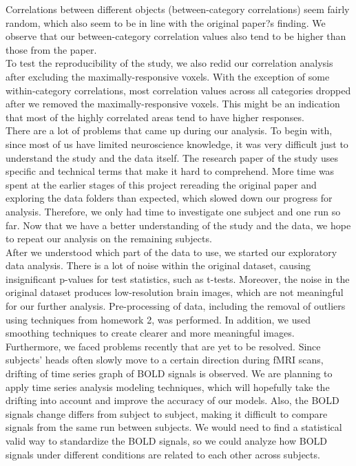 \documentclass[11pt,twocolumn]{article}
\begin{document}
Correlations between different objects (between-category correlations) seem 
fairly random, which also seem to be in line with the original paper?s finding. 
We observe that our between-category correlation values also tend to be higher 
than those from the paper. \\

To test the reproducibility of the study, we also redid our correlation analysis 
after excluding the maximally-responsive voxels. With the exception of some 
within-category correlations, most correlation values across all categories dropped 
after we removed the maximally-responsive voxels. This might be an indication 
that most of the highly correlated areas tend to have higher responses. \\

There are a lot of problems that came up during our analysis. To begin with, 
since most of us have limited neuroscience knowledge, it was very difficult 
just to understand the study and the data itself. The research paper of the 
study uses specific and technical terms that make it hard to comprehend. 
More time was spent at the earlier stages of this project rereading the 
original paper and exploring the data folders than expected, which slowed down 
our progress for analysis. Therefore, we only had time to investigate one 
subject and one run so far. Now that we have a better understanding of the 
study and the data, we hope to repeat our analysis on the remaining subjects.\\

After we understood which part of the data to use, we started our 
exploratory data analysis. There is a lot of noise within the original dataset, 
causing insignificant p-values for test statistics, such as t-tests. Moreover, 
the noise in the original dataset produces low-resolution brain images, 
which are not meaningful for our further analysis. Pre-processing of data, 
including the removal of outliers using techniques from homework 2, was 
performed. In addition, we used smoothing techniques to create clearer 
and more meaningful images. \\

Furthermore, we faced problems recently that are yet to be resolved. Since 
subjects' heads often slowly move to a certain direction during fMRI scans, 
drifting of time series graph of BOLD signals is observed. We are planning 
to apply time series analysis modeling techniques, which will hopefully take 
the drifting into account and improve the accuracy of our models. Also, the 
BOLD signals change differs from subject to subject, making it difficult to 
compare signals from the same run between subjects. We would need to 
find a statistical valid way to standardize the BOLD signals, so we could 
analyze how BOLD signals under different conditions are related to each 
other across subjects. \\






\end{document}
